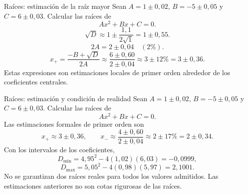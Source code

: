 \documentclass[original_version/main.tex]{subfiles}
\begin{document}
\begin{frame}{Raíces: estimación de la raíz mayor}
\small Sean $A=1\pm0{,}02$, $B=-5\pm0{,}05$ y $C=6\pm0{,}03$. Calcular las raíces de\[Ax^2+Bx+C=0.\]\[\sqrt D\approx1\pm\frac{1{,}1}{2\sqrt1}=1\pm0{,}55.\]\[2A=2\pm0{,}04\quad(2\%).\]\[x_+=\frac{-B+\sqrt D}{2A}\approx\frac{6\pm0{,}60}{2\pm0{,}04}\approx3\pm12\%=3\pm0{,}36.\]Estas expresiones son estimaciones locales de primer orden alrededor de los coeficientes centrales.
\end{frame}

\begin{frame}{Raíces: estimación y condición de realidad}
\small Sean $A=1\pm0{,}02$, $B=-5\pm0{,}05$ y $C=6\pm0{,}03$. Calcular las raíces de\[Ax^2+Bx+C=0.\]Las estimaciones formales de primer orden son\[x_+\approx3\pm0{,}36,\qquad x_-\approx\frac{4\pm0{,}60}{2\pm0{,}04}\approx2\pm17\%=2\pm0{,}34.\]Con los intervalos de los coeficientes,\[D_{\min}=4{,}95^2-4(1{,}02)(6{,}03)=-0{,}0999,\]\[D_{\max}=5{,}05^2-4(0{,}98)(5{,}97)=2{,}1001.\]No se garantizan dos raíces reales para todos los valores admitidos. Las estimaciones anteriores no son cotas rigurosas de las raíces.
\end{frame}
\end{document}
